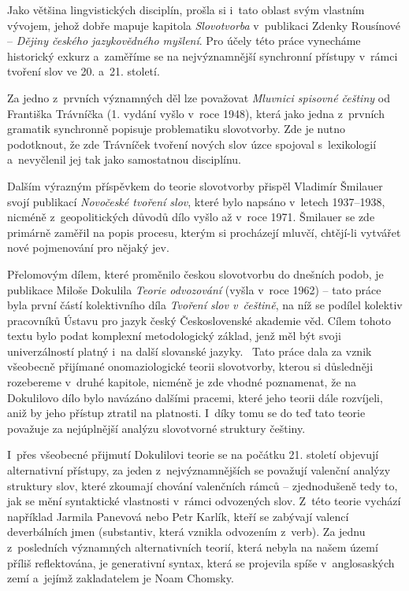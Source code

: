 Jako většina lingvistických disciplín, prošla si i~tato oblast svým
vlastním vývojem, jehož dobře mapuje kapitola \emph{Slovotvorba}
v~publikaci Zdenky Rousínové -- \emph{Dějiny českého jazykovědného
myšlení}. Pro účely této práce vynecháme historický exkurz a~zaměříme se
na nejvýznamnější synchronní přístupy v~rámci tvoření slov ve 20. a~21.
století.

Za jedno z~prvních významných děl lze považovat \emph{Mluvnici spisovné
češtiny} od Františka Trávníčka (1. vydání vyšlo v~roce 1948), která
jako jedna z~prvních gramatik synchronně popisuje problematiku
slovotvorby. Zde je nutno podotknout, že zde Trávníček tvoření nových
slov úzce spojoval s~lexikologií a~nevyčlenil jej tak jako samostatnou
disciplínu.~\parencite[263]{rousinova07}

Dalším výrazným příspěvkem do teorie slovotvorby přispěl Vladimír
Šmilauer svojí publikací \emph{Novočeské tvoření slov}, které bylo
napsáno v~letech 1937--1938, nicméně z~geopolitických důvodů dílo vyšlo
až v~roce 1971. Šmilauer se zde primárně zaměřil na popis procesu,
kterým si procházejí mluvčí, chtějí-li vytvářet nové pojmenování pro
nějaký jev.~\parencite[265]{rousinova07}

Přelomovým dílem, které proměnilo českou slovotvorbu do dnešních podob,
je publikace Miloše Dokulila \emph{Teorie odvozování} (vyšla v~roce
1962) -- tato práce byla první částí kolektivního díla \emph{Tvoření
slov v~češtině}, na níž se podílel kolektiv pracovníků Ústavu pro jazyk
český Československé akademie věd. Cílem tohoto textu bylo podat
komplexní metodologický základ, jenž měl být svoji univerzálností platný
i~na další slovanské jazyky.~\parencite[267]{rousinova07} Tato práce
dala za vznik všeobecně přijímané onomaziologické teorii slovotvorby,
kterou si důsledněji rozebereme v~druhé kapitole, nicméně je zde vhodné
poznamenat, že na Dokulilovo dílo bylo navázáno dalšími pracemi, které
jeho teorii dále rozvíjeli, aniž by jeho přístup ztratil na platnosti.
\parencite[272]{rousinova07} I~díky tomu se do teď tato teorie považuje
za nejúplnější analýzu slovotvorné struktury češtiny.
\parencite[273]{zikova07}

I~přes všeobecné přijmutí Dokulilovi teorie se na počátku 21. století
objevují alternativní přístupy, za jeden z~nejvýznamnějších se považují
valenční analýzy struktury slov, které zkoumají chování valenčních rámců
-- zjednodušeně tedy to, jak se mění syntaktické vlastnosti v~rámci
odvozených slov. Z~této teorie vychází například Jarmila Panevová nebo
Petr Karlík, kteří se zabývají valencí deverbálních jmen (substantiv,
která vznikla odvozením z~verb). Za jednu z~posledních významných
alternativních teorií, která nebyla na našem území příliš reflektována,
je generativní syntax, která se projevila spíše v~anglosaských zemí
a~jejímž zakladatelem je Noam Chomsky.~\parencite[274--275]{zikova07}
